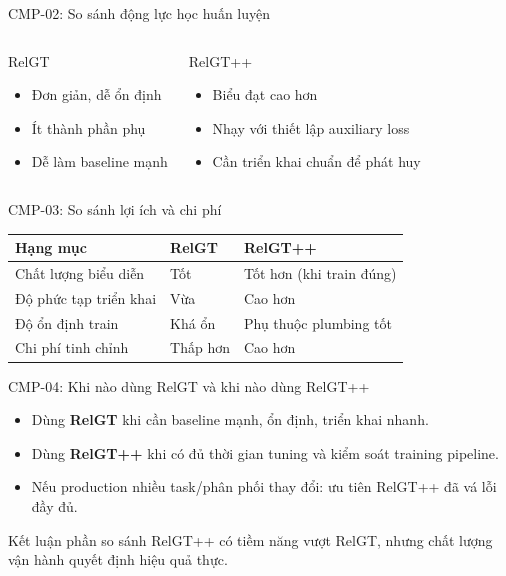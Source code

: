 \documentclass[aspectratio=169,11pt]{beamer}
\begin{document}
\begin{frame}{CMP-02: So sánh động lực học huấn luyện}
  \begin{columns}[T]
    \begin{block}{RelGT}
      \begin{itemize}
        \item Đơn giản, dễ ổn định
        \item Ít thành phần phụ
        \item Dễ làm baseline mạnh
      \end{itemize}
    \end{block}
    \begin{block}{RelGT++}
      \begin{itemize}
        \item Biểu đạt cao hơn
        \item Nhạy với thiết lập auxiliary loss
        \item Cần triển khai chuẩn để phát huy
      \end{itemize}
    \end{block}
  \end{columns}
\end{frame}

\begin{frame}{CMP-03: So sánh lợi ích và chi phí}
  \begin{table}
    \centering
    \small
    \begin{tabular}{p{3.2cm}p{3.8cm}p{3.8cm}}
      \toprule
      Hạng mục & RelGT & RelGT++ \\
      \midrule
      Chất lượng biểu diễn & Tốt & Tốt hơn (khi train đúng) \\
      Độ phức tạp triển khai & Vừa & Cao hơn \\
      Độ ổn định train & Khá ổn & Phụ thuộc plumbing tốt \\
      Chi phí tinh chỉnh & Thấp hơn & Cao hơn \\
      \bottomrule
    \end{tabular}
  \end{table}
\end{frame}

\begin{frame}{CMP-04: Khi nào dùng RelGT và khi nào dùng RelGT++}
  \begin{itemize}
    \item Dùng \textbf{RelGT} khi cần baseline mạnh, ổn định, triển khai nhanh.
    \item Dùng \textbf{RelGT++} khi có đủ thời gian tuning và kiểm soát training pipeline.
    \item Nếu production nhiều task/phân phối thay đổi: ưu tiên RelGT++ đã vá lỗi đầy đủ.
  \end{itemize}
  \begin{exampleblock}{Kết luận phần so sánh}
    RelGT++ có tiềm năng vượt RelGT, nhưng chất lượng vận hành quyết định hiệu quả thực.
  \end{exampleblock}
\end{frame}
\end{document}
